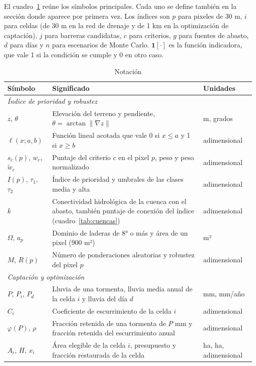 \documentclass[11pt,letterpaper]{article}
\begin{document}
El cuadro~\ref{tab:notacion} reúne los símbolos principales. Cada uno se define también en la sección donde aparece por primera vez. Los índices son $p$ para pixeles de 30 m, $i$ para celdas (de 30 m en la red de drenaje y de 1 km en la optimización de captación), $j$ para barreras candidatas, $c$ para criterios, $g$ para fuentes de abasto, $d$ para días y $n$ para escenarios de Monte Carlo. $\mathbf 1[\cdot]$ es la función indicadora, que vale 1 si la condición se cumple y 0 en otro caso.

\begin{table}[H]\centering\footnotesize
\caption{Notación}\label{tab:notacion}
\begin{tabularx}{\linewidth}{lXl}
\toprule
Símbolo & Significado & Unidades \\
\midrule
\multicolumn{3}{l}{\textit{Índice de prioridad y robustez}}\\
$z$, $\theta$ & Elevación del terreno y pendiente, $\theta=\arctan\lVert\nabla z\rVert$ & m, grados \\
$\ell(x;a,b)$ & Función lineal acotada que vale 0 si $x\le a$ y 1 si $x\ge b$ & adimensional \\
$s_c(p)$, $w_c$, $\tilde w_c$ & Puntaje del criterio $c$ en el pixel $p$, peso y peso normalizado & adimensional \\
$I(p)$, $\tau_1$, $\tau_2$ & Índice de prioridad y umbrales de las clases media y alta & adimensional \\
$k$ & Conectividad hidrológica de la cuenca con el abasto, también puntaje de conexión del índice (cuadro~\ref{tab:cuencas}) & adimensional \\
$\Omega$, $a_p$ & Dominio de laderas de 8° o más y área de un pixel (900 m²) & m² \\
$M$, $R(p)$ & Número de ponderaciones aleatorias y robustez del pixel $p$ & adimensional \\
\multicolumn{3}{l}{\textit{Captación y optimización}}\\
$P$, $P_i$, $P_d$ & Lluvia de una tormenta, lluvia media anual de la celda $i$ y lluvia del día $d$ & mm, mm/año \\
$C_i$ & Coeficiente de escurrimiento de la celda $i$ & adimensional \\
$\varphi(P)$, $\rho$ & Fracción retenida de una tormenta de $P$ mm y fracción retenida del escurrimiento anual & adimensional \\
$A_i$, $H$, $x_i$ & Área elegible de la celda $i$, presupuesto y fracción restaurada de la celda & ha, ha, adimensional \\

\end{tabularx}
\end{table}
\end{document}
